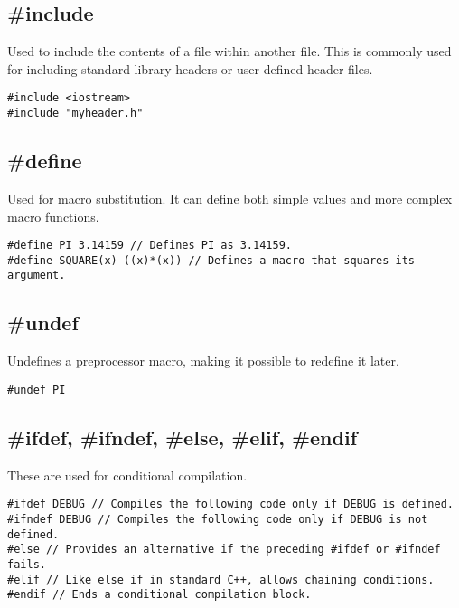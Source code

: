 \documentclass{report}
\begin{document}
    \subsection{\#include}
    \bigbreak \noindent 
    Used to include the contents of a file within another file. This is commonly used for including standard library headers or user-defined header files.
    \bigbreak \noindent 
    \sepline
    \begin{verbatim}
#include <iostream>
#include "myheader.h"
    \end{verbatim}
    \sepline

    \bigbreak \noindent 
    \subsection{\#define}
    \bigbreak \noindent 
    Used for macro substitution. It can define both simple values and more complex macro functions.
    \bigbreak \noindent 
    \sepline
    \begin{verbatim}
#define PI 3.14159 // Defines PI as 3.14159.
#define SQUARE(x) ((x)*(x)) // Defines a macro that squares its argument.
    \end{verbatim}
    \sepline

    \bigbreak \noindent 
    \subsection{\#undef}
    \bigbreak \noindent 
    Undefines a preprocessor macro, making it possible to redefine it later.
    \bigbreak \noindent 
    \sepline
    \begin{verbatim}
#undef PI
    \end{verbatim}
    \sepline

    \bigbreak \noindent 
    \subsection{\#ifdef, \#ifndef, \#else, \#elif, \#endif}
    \bigbreak \noindent 
    These are used for conditional compilation.
    \bigbreak \noindent 
    \sepline
    \begin{verbatim}
#ifdef DEBUG // Compiles the following code only if DEBUG is defined.
#ifndef DEBUG // Compiles the following code only if DEBUG is not defined.
#else // Provides an alternative if the preceding #ifdef or #ifndef fails.
#elif // Like else if in standard C++, allows chaining conditions.
#endif // Ends a conditional compilation block.
    \end{verbatim}
    \sepline
\end{document}
